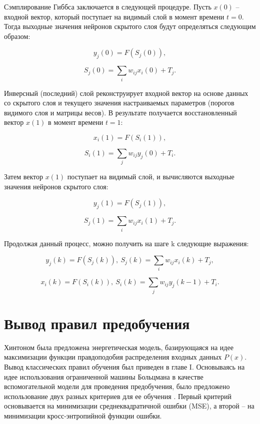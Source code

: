 Сэмплирование Гиббса заключается в следующей процедуре. Пусть $x(0)$ -- входной вектор, который поступает на видимый слой в момент времени $t=0$. Тогда выходные значения нейронов скрытого слоя будут определяться следующим образом:

\begin{equation}
    y_j(0)=F(S_j(0)),
\end{equation}

\begin{equation}
    S_j(0)=\sum_i w_{ij}x_i(0)+T_j.
\end{equation}

Инверсный (последний) слой  реконструирует входной вектор на основе данных со скрытого слоя и текущего значения настраиваемых параметров (порогов видимого слоя и матрицы весов). В результате получается восстановленный вектор $x(1)$ в момент времени $t=1$:

\begin{equation}
    x_i(1)=F(S_i(1)),
\end{equation}

\begin{equation}
    S_i(1)=\sum_j w_{ij}y_j(0)+T_i.
\end{equation}

Затем вектор $x(1)$ поступает на видимый слой, и вычисляются выходные значения нейронов скрытого слоя: 

\begin{equation}
    y_j(1)=F(S_j(1)),
\end{equation}

\begin{equation}
    S_j(1)=\sum_i w_{ij}x_i(1)+T_j.
\end{equation}

Продолжая данный процесс, можно получить на шаге k следующие выражения:

\begin{equation*}		
    y_j(k)=F(S_j(k)),\ S_j(k)=\sum_i w_{ij}x_i(k)+T_j,
\end{equation*}

\begin{equation*}		
    x_i(k)=F(S_i(k)),\ S_i(k)=\sum_j w_{ij}y_j(k-1)+T_i.
\end{equation*}

\section{Вывод правил предобучения} 

Хинтоном была предложена энергетическая модель, базирующаяся на идее максимизации функции правдоподобия распределения входных данных $P(x)$. Вывод классических правил обучения был приведен в главе I. Основываясь на идее использования ограниченной машины Больцмана в качестве вспомогательной модели для проведения предобучения, было предложено использование двух разных критериев для ее обучения \cite{4-A}. Первый критерий основывается на минимизации среднеквадратичной ошибки (MSE), а второй -- на минимизации кросс-энтропийной функции ошибки.

